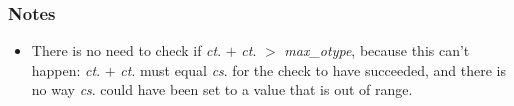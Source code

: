 \subsubsection*{Notes}

\begin{itemize}
\item
There is no need to check if \emph{ct}.\cbase{} $+$ \emph{ct}.\coffset{}
$>$ \emph{max\_otype}, because this can't happen:
\emph{ct}.\cbase{} $+$ \emph{ct}.\coffset{} must equal \emph{cs}.\cotype{}
for the \cotype{} check to have succeeded, and there is no way
\emph{cs}.\cotype{} could have been set to a value that is out of range.
\end{itemize}
